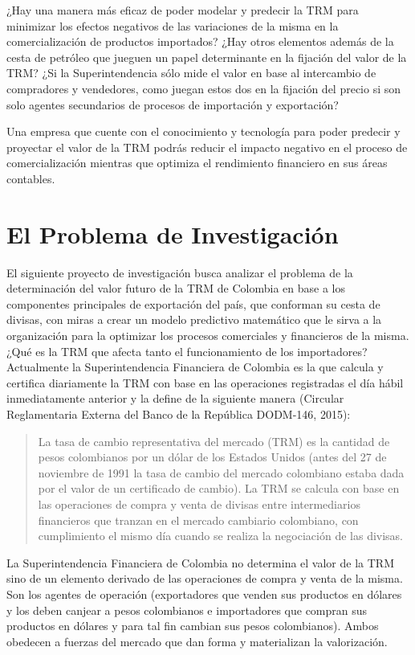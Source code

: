 ¿Hay una manera más eficaz de poder modelar y predecir la TRM para minimizar los efectos negativos de las variaciones de la misma en la comercialización de productos importados? ¿Hay otros elementos además de la cesta de petróleo que jueguen un papel determinante en la fijación del valor de la TRM? ¿Si la Superintendencia sólo mide el valor en base al intercambio de compradores y vendedores, como juegan estos dos en la fijación del precio si son solo agentes secundarios de procesos de importación y exportación?

Una empresa que cuente con el conocimiento y tecnología para poder predecir y proyectar el valor de la TRM podrás reducir el impacto negativo en el proceso de comercialización mientras que optimiza el rendimiento financiero en sus áreas contables. 

\section{El Problema de Investigación}
El siguiente proyecto de investigación busca analizar el problema de la determinación del valor futuro de la TRM de Colombia en base a los componentes principales de exportación del país, que conforman su cesta de divisas, con miras a crear un modelo predictivo matemático que le sirva a la organización para la optimizar los procesos comerciales y financieros de la misma. ¿Qué es la TRM que afecta tanto el funcionamiento de los importadores? Actualmente la Superintendencia Financiera de Colombia es la que calcula y certifica diariamente la TRM con base en las operaciones registradas el día hábil inmediatamente anterior y la define de la siguiente manera (Circular Reglamentaria Externa del Banco de la República DODM-146, 2015):

\begin{quotation}
	La tasa de cambio representativa del mercado (TRM) es la cantidad de pesos colombianos por un dólar de los Estados Unidos (antes del 27 de noviembre de 1991 la tasa de cambio del mercado colombiano estaba dada por el valor de un certificado de cambio). La TRM se calcula con base en las operaciones de compra y venta de divisas entre intermediarios financieros que tranzan en el mercado cambiario colombiano, con cumplimiento el mismo día cuando se realiza la negociación de las divisas.
\end{quotation}

La Superintendencia Financiera de Colombia no determina el valor de la TRM sino de un elemento derivado de las operaciones de compra y venta de la misma. Son los agentes de operación (exportadores que venden sus productos en dólares y los deben canjear a pesos colombianos e importadores que compran sus productos en dólares y para tal fin cambian sus pesos colombianos). Ambos obedecen a fuerzas del mercado que dan forma y materializan la valorización. 

